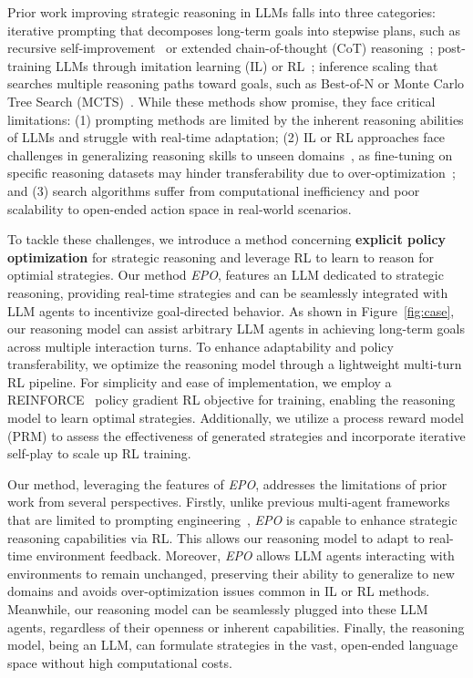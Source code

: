 Prior work improving strategic reasoning in LLMs falls into three categories: iterative prompting that decomposes long-term goals into stepwise plans, such as recursive self-improvement~\cite{madaan2023selfrefine,shinn2024reflexion} or extended chain-of-thought (CoT) reasoning~\cite{wei2022chain,yao2023react}; post-training LLMs through imitation learning (IL) or RL~\cite{chen2023fireact,song-etal-2024-trial}; inference scaling that searches multiple reasoning paths toward goals, such as Best-of-N or Monte Carlo Tree Search (MCTS)~\cite{yu-etal-2023-prompt,he-etal-2024-planning, putta2024agent}.
While these methods show promise, they face critical limitations: (1) prompting methods are limited by the inherent reasoning abilities of LLMs and struggle with real-time adaptation; (2) IL or RL approaches face challenges in generalizing reasoning skills to unseen domains~\cite{patil2025advancing}, as fine-tuning on specific reasoning datasets may hinder transferability due to over-optimization~\cite{Bakhtin2022HumanlevelPI,li2024dialogue}; and (3) search algorithms suffer from computational inefficiency and poor scalability to open-ended action space in real-world scenarios.

To tackle these challenges, we introduce a method concerning \textbf{explicit policy optimization} for strategic reasoning and leverage RL to learn to reason for optimial strategies.
Our method \textit{EPO}, features an LLM dedicated to strategic reasoning, providing real-time strategies and can be seamlessly integrated with LLM agents to incentivize goal-directed behavior.
As shown in Figure~\ref{fig:case}, our reasoning model can assist arbitrary LLM agents in achieving long-term goals across multiple interaction turns.
To enhance adaptability and policy transferability, we optimize the reasoning model through a lightweight multi-turn RL pipeline.
For simplicity and ease of implementation, we employ a REINFORCE~\cite{sutton1999policy} policy gradient RL objective for training, enabling the reasoning model to learn optimal strategies.
Additionally, we utilize a process reward model (PRM) to assess the effectiveness of generated strategies and incorporate iterative self-play to scale up RL training.

Our method, leveraging the features of \textit{EPO}, addresses the limitations of prior work from several perspectives. Firstly, unlike previous multi-agent frameworks that are limited to prompting engineering~\cite{gandhi2023strategic,duan-etal-2024-reta}, \textit{EPO} is capable to enhance strategic reasoning capabilities via RL. This allows our reasoning model to adapt to real-time environment feedback. Moreover, \textit{EPO} allows LLM agents interacting with environments to remain unchanged, preserving their ability to generalize to new domains and avoids over-optimization issues common in IL or RL methods.
Meanwhile, our reasoning model can be seamlessly plugged into these LLM agents, regardless of their openness or inherent capabilities. Finally, the reasoning model, being an LLM, can formulate strategies in the vast, open-ended language space without high computational costs.

